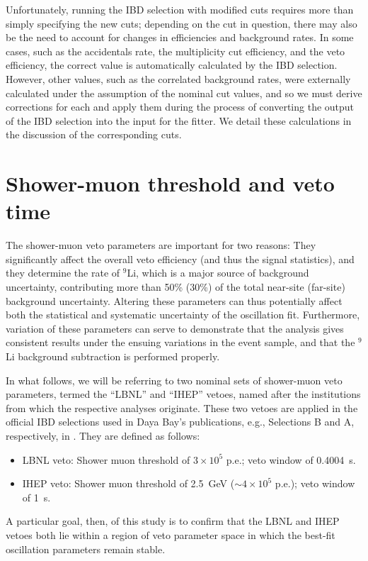 \documentclass[../thesis.tex]{subfiles}
\begin{document}
Unfortunately, running the IBD selection with modified cuts requires more than simply specifying the new cuts; depending on the cut in question, there may also be the need to account for changes in efficiencies and background rates. In some cases, such as the accidentals rate, the multiplicity cut efficiency, and the veto efficiency, the correct value is automatically calculated by the IBD selection. However, other values, such as the correlated background rates, were externally calculated under the assumption of the nominal cut values, and so we must derive corrections for each and apply them during the process of converting the output of the IBD selection into the input for the fitter. We detail these calculations in the discussion of the corresponding cuts.

\section{Shower-muon threshold and veto time}
\label{sec:cutVaryShowerMuon}

The shower-muon veto parameters are important for two reasons: They significantly affect the overall veto efficiency (and thus the signal statistics), and they determine the rate of $^9$Li, which is a major source of background uncertainty, contributing more than 50\% (30\%) of the total near-site (far-site) background uncertainty. Altering these parameters can thus potentially affect both the statistical and systematic uncertainty of the oscillation fit. Furthermore, variation of these parameters can serve to demonstrate that the analysis gives consistent results under the ensuing variations in the event sample, and that the $^9$Li background subtraction is performed properly.

In what follows, we will be referring to two nominal sets of shower-muon veto parameters, termed the ``LBNL'' and ``IHEP'' vetoes, named after the institutions from which the respective analyses originate. These two vetoes are applied in the official IBD selections used in Daya Bay's publications, e.g., Selections B and A, respectively, in \cite{An_2017}. They are defined as follows:
\begin{itemize}
\item LBNL veto: Shower muon threshold of $3\times10^5$ p.e.; veto window of 0.4004~s.
\item IHEP veto: Shower muon threshold of 2.5~GeV ($\sim4\times10^5$ p.e.); veto window of 1~s.
\end{itemize}
A particular goal, then, of this study is to confirm that the LBNL and IHEP vetoes both lie within a region of veto parameter space in which the best-fit oscillation parameters remain stable.
\end{document}
